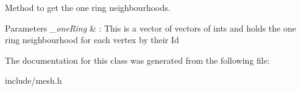 Method to get the one ring neighbourhoods. 


\begin{DoxyParams}{Parameters}
{\em \+\_\+one\+Ring} & \+: This is a vector of vectors of ints and holds the one ring neighbourhood for each vertex by their Id \\
\hline
\end{DoxyParams}


The documentation for this class was generated from the following file\+:\begin{DoxyCompactItemize}
\item 
include/mesh.\+h\end{DoxyCompactItemize}
